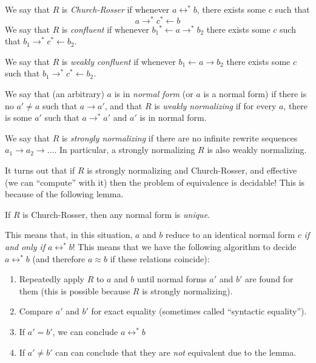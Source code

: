\begin{definition}
  We say that $R$ is \emph{Church-Rosser} if whenever $a\leftrightarrow^* b$, there exists some $c$ such that
  \[a\rightarrow^* c{}^*\leftarrow b\]
  We say that $R$ is \emph{confluent} if whenever $b_1{}^*\leftarrow a\rightarrow^* b_2$ there exists some $c$ such that $b_1\rightarrow^* c{}^*\leftarrow b_2$.
  
  We say that $R$ is \emph{weakly confluent} if whenever $b_1\leftarrow a\rightarrow b_2$ there exists some $c$ such that $b_1\rightarrow^* c{}^*\leftarrow b_2$.
  
  We say that (an arbitrary) $a$ is in \emph{normal form} (or $a$ is a normal form) if there is no $a' \neq a$ such that $a \rightarrow a'$, and that $R$ is \emph{weakly normalizing} if for every $a$, there is some $a'$ such that $a\rightarrow^*a'$ and $a'$ is in normal form.

  We say that $R$ is \emph{strongly normalizing} if there are no infinite rewrite sequences $a_1\rightarrow a_2\rightarrow \ldots$. In particular, a strongly normalizing $R$ is also weakly normalizing.
\end{definition}

It turns out that if $R$ is strongly normalizing and Church-Rosser, and effective (we can ``compute'' with it) then the problem of equivalence is decidable! This is because of the following lemma.

\begin{lemma}
  If $R$ is Church-Rosser, then any normal form is \emph{unique}.
\end{lemma}

This means that, in this situation, $a$ and $b$ reduce to an identical normal form $c$ \emph{if and only if} $a\leftrightarrow^* b$! This means that we have the following algorithm to decide $a\leftrightarrow^* b$ (and therefore $a\approx b$ if these relations coincide):
\begin{enumerate}
\item Repeatedly apply $R$ to $a$ and $b$ until normal forms $a'$ and $b'$ are found for them (this is possible because $R$ is strongly normalizing).
\item Compare $a'$ and $b'$ for exact equality (sometimes called ``syntactic equality'').
\item If $a' = b'$, we can conclude $a\leftrightarrow^* b$
\item If $a' \neq b'$ can can conclude that they are \emph{not} equivalent due to the lemma.
\end{enumerate}

